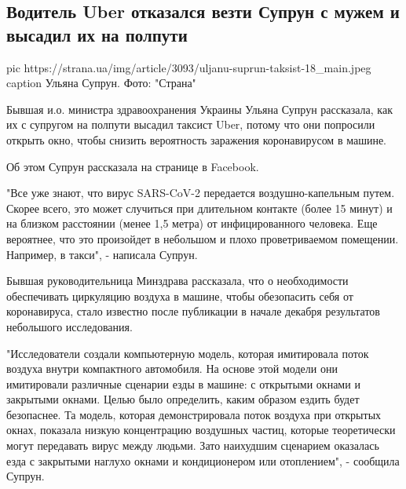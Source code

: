  
 
 
 
 
 
\subsection{Водитель Uber отказался везти Супрун с мужем и высадил их на полпути}
\label{sec:29_12_2020.news.ua.strana.3.voditel_uber_suprun}

\ifcmt
  pic https://strana.ua/img/article/3093/uljanu-suprun-taksist-18_main.jpeg
	caption Ульяна Супрун. Фото: "Страна" 
\fi

Бывшая и.о. министра здравоохранения Украины Ульяна Супрун рассказала, как их с
супругом на полпути высадил таксист Uber, потому что они попросили открыть
окно, чтобы снизить вероятность заражения коронавирусом в машине. 

Об этом Супрун рассказала на странице в Facebook.

"Все уже знают, что вирус SARS-CoV-2 передается воздушно-капельным путем.
Скорее всего, это может случиться при длительном контакте (более 15 минут) и на
близком расстоянии (менее 1,5 метра) от инфицированного человека. Еще
вероятнее, что это произойдет в небольшом и плохо проветриваемом помещении.
Например, в такси", - написала Супрун.

Бывшая руководительница Минздрава рассказала, что о необходимости обеспечивать
циркуляцию воздуха в машине, чтобы обезопасить себя от коронавируса, стало
известно после публикации в начале декабря результатов небольшого исследования. 

"Исследователи создали компьютерную модель, которая имитировала поток воздуха
внутри компактного автомобиля. На основе этой модели они имитировали различные
сценарии езды в машине: с открытыми окнами и закрытыми окнами. Целью было
определить, каким образом ездить будет безопаснее. Та модель, которая
демонстрировала поток воздуха при открытых окнах, показала низкую концентрацию
воздушных частиц, которые теоретически могут передавать вирус между людьми.
Зато наихудшим сценарием оказалась езда с закрытыми наглухо окнами и
кондиционером или отоплением", - сообщила Супрун. 

